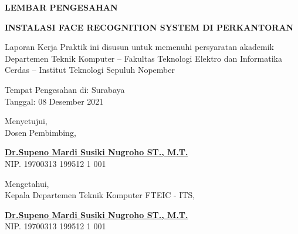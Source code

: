 \begin{center}
  {\Large \textbf{LEMBAR PENGESAHAN}}
  \vspace{6ex}


  {\large \textbf{INSTALASI FACE RECOGNITION SYSTEM DI PERKANTORAN}}
  \vspace{6ex}

  Laporan Kerja Praktik ini disusun untuk memenuhi persyaratan akademik Departemen Teknik Komputer – Fakultas Teknologi Elektro dan Informatika Cerdas – Institut Teknologi Sepuluh Nopember
  \vspace{2ex}

  Tempat Pengesahan di: Surabaya \\
  Tanggal: 08 Desember 2021
  \vspace{8ex}

  Menyetujui, \\
  Dosen Pembimbing,
  \vspace{12ex}

  \textbf{\underline{Dr.Supeno Mardi Susiki Nugroho ST., M.T.}} \\
  NIP. 19700313 199512 1 001
  \vspace{8ex}

  Mengetahui, \\
  Kepala Departemen Teknik Komputer FTEIC - ITS,
  \vspace{12ex}

  \textbf{\underline{Dr.Supeno Mardi Susiki Nugroho ST., M.T.}} \\
  NIP. 19700313 199512 1 001

\end{center}
